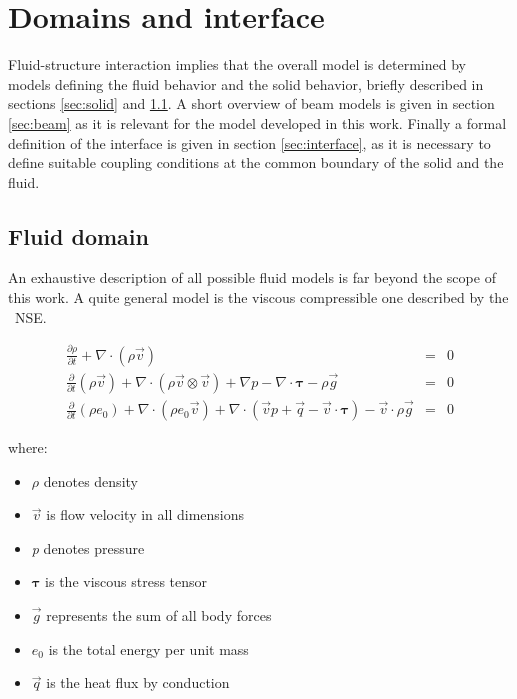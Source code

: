 \section{Domains and interface}
\label{sec:models}

Fluid-structure interaction implies that the overall model is determined by models defining the fluid behavior and the solid behavior, briefly described in sections \ref{sec:solid} and \ref{sec:fluid}. A short overview of beam models is given in section \ref{sec:beam} as it is relevant for the model developed in this work.
Finally a formal definition of the interface is given in section \ref{sec:interface}, as it is necessary to define suitable coupling conditions at the common boundary of the solid and the fluid.


\subsection{Fluid domain}
\label{sec:fluid}

An exhaustive description of all possible fluid models is far beyond the scope of this work. A quite general model is the viscous compressible one described by the ~\ac{NSE}. 

\begin{subequations}
\begin{eqnarray}
	\label{eq:cont}
	\frac{\partial{\rho}}{\partial{t}} + \nabla \cdot \left(\rho \vec{v}\right) &=&  0 \\	
	\label{eq:mom-cons} 
	\frac{\partial }{\partial t}\left( \rho \vec{v} \right) + \nabla \cdot \left( \rho \vec{v} \otimes \vec{v} \right) +\nabla p - \nabla \cdot \mathbf{\tau} - \rho \vec{g} &=& 0 \\
	\label{eq:energy-cons}
	\frac{\partial }{\partial t}\left( \rho e_0  \right) + \nabla \cdot \left( \rho e_0 \vec{v} \right) + \nabla \cdot \left( \vec{v}p + \vec{q} -\vec{v} \cdot \bm{\tau} \right) - \vec{v} \cdot \rho \vec{g} &=& 0
\end{eqnarray}
\end{subequations}

where:
\begin{itemize}
	\item $\rho$ denotes density
	\item $\vec{v}$ is flow velocity in all dimensions
	\item \textit{p} denotes pressure
	\item $\bm{\tau}$ is the viscous stress tensor
	\item $\vec{g}$ represents the sum of all body forces
	\item $e_0$ is the total energy per unit mass
	\item $\vec{q}$ is the heat flux by conduction
\end{itemize}

